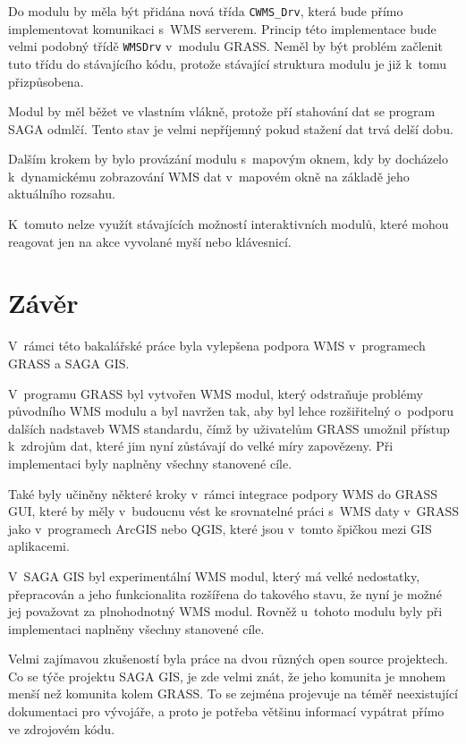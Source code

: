 \documentclass[a4paper,12pt]{article}
\begin{document}
Do modulu by měla být přidána nová třída {\tt CWMS\_Drv}, která bude přímo
implementovat komunikaci s~WMS serverem. Princip této implementace
bude velmi podobný třídě {\tt WMSDrv} v~modulu GRASS. Neměl by být problém
začlenit tuto třídu do stávajícího kódu, protože stávající struktura
modulu je již k~tomu přizpůsobena.

Modul by měl běžet ve vlastním vlákně, protože pří stahování dat se
program SAGA odmlčí. Tento stav je velmi nepříjemný pokud
stažení dat trvá delší dobu. 

Dalším krokem by bylo provázání modulu s~mapovým oknem, kdy by
docházelo k~dynamickému zobrazování WMS dat v~mapovém okně na základě 
jeho aktuálního rozsahu.

K~tomuto nelze využít stávajících možností interaktivních modulů,
které mohou reagovat jen na akce vyvolané myší nebo klávesnicí.


\newpage 
\section{Závěr}

V~rámci této bakalářské práce byla vylepšena podpora WMS v~programech 
GRASS a SAGA GIS. 

V~programu GRASS byl vytvořen WMS modul, který odstraňuje problémy 
původního WMS modulu a byl navržen tak, aby byl lehce
rozšiřitelný o~podporu dalších nadstaveb WMS standardu, čímž by 
uživatelům GRASS umožnil přístup k~zdrojům dat, které jim nyní zůstávají 
do velké míry zapovězeny. Při implementaci byly naplněny všechny 
stanovené cíle. 

Také byly učiněny některé kroky v~rámci integrace  podpory WMS 
do GRASS GUI, které by měly v~budoucnu vést ke srovnatelné práci s~WMS daty
v~GRASS jako v~programech ArcGIS nebo QGIS, které jsou v~tomto špičkou 
mezi GIS aplikacemi.

V~SAGA GIS byl experimentální WMS modul, 
který má velké nedostatky, přepracován
 a jeho funkcionalita rozšířena do takového stavu, že nyní je možné 
 jej považovat za plnohodnotný WMS modul. Rovněž u~tohoto modulu byly při implementaci naplněny všechny stanovené cíle. 

Velmi zajímavou zkušeností byla práce na dvou
různých open source projektech. Co se týče projektu SAGA GIS, je zde velmi
znát, že jeho komunita je mnohem menší než komunita kolem GRASS. 
To se zejména projevuje na téměř neexistující dokumentaci pro vývojáře,
a proto je potřeba většinu informací vypátrat přímo ve zdrojovém kódu.
\end{document}
